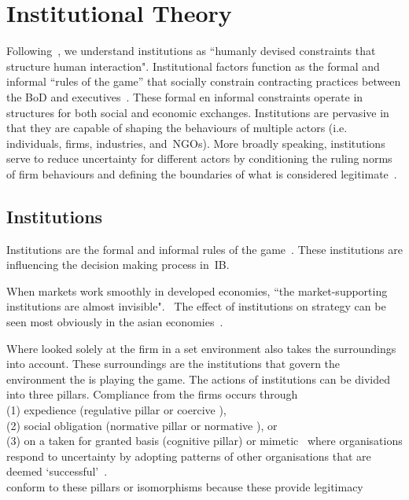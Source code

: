 \section{Institutional Theory}\label{sec:InTh}


Following~\cite{North:1990}, we understand institutions as ``humanly devised constraints that structure human interaction". 
Institutional factors function as the formal and informal ``rules of the game'' that socially constrain contracting practices between the \gls{BoD} and executives~\cite{North:1990}.
These formal en informal constraints operate in structures for both social and economic exchanges. 
Institutions are pervasive in that they are capable of shaping the behaviours of multiple actors (i.e. 
individuals, firms, industries, and~\glspl{NGO}). 
More broadly speaking, institutions serve to reduce uncertainty for different actors by conditioning the ruling norms of firm behaviours and defining the boundaries of what is considered legitimate~\cite{Peng:2008}.\\

\subsection{Institutions}

Institutions are the formal and informal rules of the game~\cite{North:1990}. These institutions are influencing the decision making process in~\gls{IB}.

When markets work smoothly in developed economies, ``the market-supporting institutions are almost invisible".~\cite{McMillan:2008}
The effect of institutions on strategy can be seen most obviously in the asian economies~\cite{Peng:2002}.





Where \rbv looked solely at the firm in a set environment \ibv also takes the surroundings into account. These surroundings are the institutions that govern the environment the \mne is playing the game. 
The actions of institutions can be divided into three pillars. Compliance from the firms occurs through \\(1) expedience (regulative pillar or coercive \iso),\\
 (2) social obligation (normative pillar or normative \iso), or \\
 (3) on a taken for granted basis (cognitive pillar) or mimetic \iso~where organisations respond to uncertainty by adopting patterns of other organisations that are deemed `successful'~\cite{Westney:2005,Peng:2008,Kostova:1999,DiMaggio:1983,Scott:1995}.\\ 
\mne conform to these pillars or isomorphisms because these provide legitimacy~\cite{Powell:1991}

